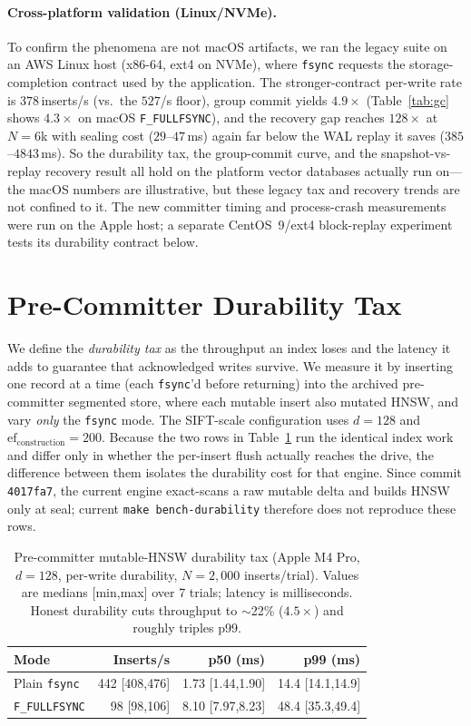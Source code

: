 \documentclass[sigconf,nonacm,balance=false]{acmart}
\newcommand{\fullfsync}{\texttt{F\_FULLFSYNC}}
\newcommand{\fsync}{\texttt{fsync}}
\begin{document}
\paragraph{Cross-platform validation (Linux/NVMe).} To confirm the phenomena are
not macOS artifacts, we ran the legacy suite on an AWS Linux host (x86-64, ext4 on
NVMe), where \fsync{} requests the storage-completion contract used by the
application. The stronger-contract per-write rate is
$378$\,inserts/s (vs.\ the $527$/s floor), group commit yields $4.9\times$
(Table~\ref{tab:gc} shows $4.3\times$ on macOS \fullfsync{}), and the recovery gap
reaches $128\times$ at $N{=}6$k with sealing cost ($29$--$47$\,ms) again far below
the WAL replay it saves ($385$--$4843$\,ms). So the durability tax, the group-commit
curve, and the snapshot-vs-replay recovery result all hold on the platform vector
databases actually run on---the macOS numbers are illustrative, but these legacy
tax and recovery trends are not confined to it. The new committer timing and
process-crash measurements were run on the Apple host; a separate CentOS~9/ext4
block-replay experiment tests its durability contract below.

\section{Pre-Committer Durability Tax}
\label{sec:tax}
We define the \emph{durability tax} as the throughput an index loses and the
latency it adds to guarantee that acknowledged writes survive. We measure it by
inserting one record at a time (each \fsync{}'d before returning) into the
archived pre-committer segmented store, where each mutable insert also mutated
HNSW, and vary \emph{only} the \fsync{} mode. The SIFT-scale configuration uses
$d{=}128$ and $\mathrm{ef}_{\mathrm{construction}}{=}200$. Because the two rows in
Table~\ref{tab:tax} run the identical index work and differ only in whether the
per-insert flush actually reaches the drive, the difference between them isolates
the durability cost for that engine. Since commit \texttt{4017fa7}, the current
engine exact-scans a raw mutable delta and builds HNSW only at seal; current
\texttt{make bench-durability} therefore does not reproduce these rows.

\begin{table}[t]
\centering
\caption{Pre-committer mutable-HNSW durability tax (Apple M4 Pro, $d{=}128$,
per-write durability, $N{=}2{,}000$ inserts/trial). Values are medians
[min,max] over 7 trials; latency is milliseconds. Honest durability cuts
throughput to $\sim$22\% ($4.5\times$) and roughly triples p99.}
\label{tab:tax}
\small
\begin{tabular}{@{}lrrr@{}}
\toprule
Mode & Inserts/s & p50 (ms) & p99 (ms) \\
\midrule
Plain \fsync{} & 442 [408,476] & 1.73 [1.44,1.90] & 14.4 [14.1,14.9] \\
\fullfsync{} & 98 [98,106] & 8.10 [7.97,8.23] & 48.4 [35.3,49.4] \\
\bottomrule
\end{tabular}
\end{table}
\end{document}
